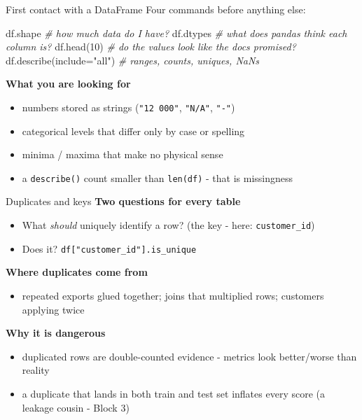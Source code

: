 \documentclass[10pt,aspectratio=169]{beamer}
\begin{document}
\begin{frame}[fragile]{First contact with a DataFrame}
\small Four commands before anything else:
{\footnotesize
\begin{semiverbatim}
df.shape                  \textit{\# how much data do I have?}
df.dtypes                 \textit{\# what does pandas think each column is?}
df.head(10)               \textit{\# do the values look like the docs promised?}
df.describe(include="all")  \textit{\# ranges, counts, uniques, NaNs}
\end{semiverbatim}}
  \vspace{0.4em}
  \textbf{What you are looking for}
  \begin{itemize}\small
    \item numbers stored as strings (\texttt{"12 000"}, \texttt{"N/A"}, \texttt{"-"})
    \item categorical levels that differ only by case or spelling
    \item minima / maxima that make no physical sense
    \item a \texttt{describe()} count smaller than \texttt{len(df)} - that is missingness
  \end{itemize}
\end{frame}

\begin{frame}[fragile]{Duplicates and keys}
  \textbf{Two questions for every table}
  \begin{itemize}\small
    \item What \emph{should} uniquely identify a row? (the key - here:
          \texttt{customer\_id})
    \item Does it? \quad
          {\footnotesize\texttt{df["customer\_id"].is\_unique}}
  \end{itemize}
  \vspace{0.4em}
  \textbf{Where duplicates come from}
  \begin{itemize}\small
    \item repeated exports glued together; joins that multiplied rows;
          customers applying twice
  \end{itemize}
  \vspace{0.4em}
  \textbf{Why it is dangerous}
  \begin{itemize}\small
    \item duplicated rows are double-counted evidence - metrics look
          better/worse than reality
    \item a duplicate that lands in both train and test set \alert{inflates
          every score} (a leakage cousin - Block 3)
  \end{itemize}
\end{frame}
\end{document}
